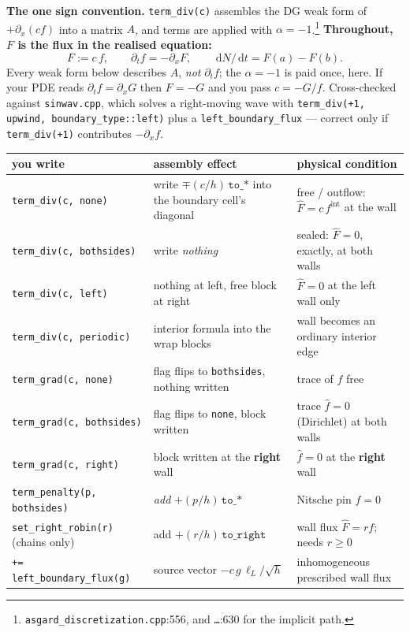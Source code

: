 \documentclass[10pt]{article}
\newcommand{\code}[1]{\texttt{#1}}
\newcommand{\dd}{\,\mathrm{d}}
\newcommand{\hF}{\widehat{F}}
\newcommand{\hf}{\widehat{f}}
\newcommand{\fl}[2]{\texttt{#1}:#2}
\begin{document}
\textbf{The one sign convention.} \code{term\_div(c)} assembles the DG weak form
of $+\partial_x(cf)$ into a matrix $A$, and terms are applied with
$\alpha=-1$.\footnote{\fl{asgard\_discretization.cpp}{556}, and \fl{\dots}{630}
for the implicit path.} \textbf{Throughout, $F$ is the flux in the realised
equation:}
\begin{equation}
\boxed{\;F := c\,f, \qquad \partial_t f = -\partial_x F, \qquad
       \dd N/\dd t = F(a) - F(b).\;}
\label{eq:sign}
\end{equation}
Every weak form below describes $A$, \emph{not} $\partial_t f$; the $\alpha=-1$
is paid once, here. If your PDE reads $\partial_t f=\partial_x G$ then $F=-G$ and
you pass $c=-G/f$. Cross-checked against \code{sinwav.cpp}, which solves a
right-moving wave with \code{term\_div(+1, upwind, boundary\_type::left)} plus a
\code{left\_boundary\_flux} --- correct only if \code{term\_div(+1)} contributes
$-\partial_x f$.

\begin{center}\small
\begin{tabular}{@{}p{4.4cm}p{5.1cm}p{6.0cm}@{}}
\toprule
you write & assembly effect & physical condition \\
\midrule
\code{term\_div(c, none)}      & write $\mp(c/h)\,\code{to\_*}$ into the boundary cell's diagonal & free / outflow: $\hF = c\,f^{\mathrm{int}}$ at the wall \\
\code{term\_div(c, bothsides)} & write \emph{nothing} & sealed: $\hF = 0$, exactly, at both walls \\
\code{term\_div(c, left)}      & nothing at left, free block at right & $\hF=0$ at the left wall only \\
\code{term\_div(c, periodic)}  & interior formula into the wrap blocks & wall becomes an ordinary interior edge \\
\code{term\_grad(c, none)}     & flag flips to \code{bothsides}, nothing written & trace of $f$ free \\
\code{term\_grad(c, bothsides)}& flag flips to \code{none}, block written & trace $\hf=0$ (Dirichlet) at both walls \\
\code{term\_grad(c, right)}    & block written at the \textbf{right} wall & $\hf=0$ at the \textbf{right} wall \\
\code{term\_penalty(p, bothsides)} & \emph{add} $+(p/h)\,\code{to\_*}$ & Nitsche pin $f=0$ \\
\code{set\_right\_robin(r)} (chains only) & add $+(r/h)\,\code{to\_right}$ & wall flux $\hF=rf$; needs $r\ge0$ \\
\code{+= left\_boundary\_flux(g)}  & source vector $-c\,g\,\ell_L/\sqrt{h}$ & inhomogeneous prescribed wall flux \\
\bottomrule
\end{tabular}
\end{center}
\end{document}
